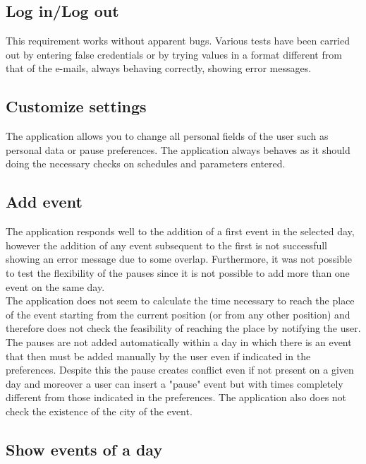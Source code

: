 \documentclass[numbers=noenddot, 12pt, a4paper, oneside]{scrbook}
\begin{document}
\subsection*{Log in/Log out}
This requirement works without apparent bugs. Various tests have been carried out by entering false credentials or by trying values in a format different from that of the e-mails, always behaving correctly, showing error messages.

\subsection*{Customize settings}
The application allows you to change all personal fields of the user such as personal data or pause preferences. The application always behaves as it should doing the necessary checks on schedules and parameters entered.

\subsection*{Add event}

The application responds well to the addition of a first event in the selected day, however the addition of any event subsequent to the first is not successfull showing an error message due to some overlap. Furthermore, it was not possible to test the flexibility of the pauses since it is not possible to add more than one event on the same day.\\

The application does not seem to calculate the time necessary to reach the place of the event starting from the current position (or from any other position) and therefore does not check the feasibility of reaching the place by notifying the user.\\

The pauses are not added automatically within a day in which there is an event that then must be added manually by the user even if indicated in the preferences. Despite this the pause creates conflict even if not present on a given day and moreover a user can insert a "pause" event but with times completely different from those indicated in the preferences.
The application also does not check the existence of the city of the event.

\subsection*{Show events of a day}
\end{document}
